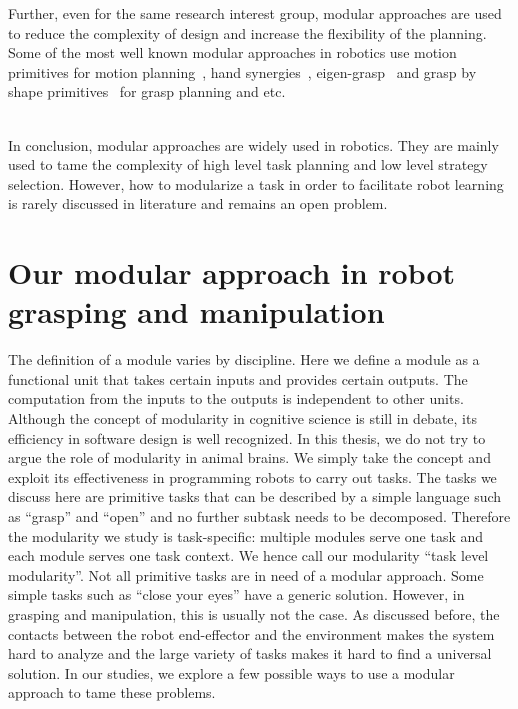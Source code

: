 Further, even for the same research interest group, modular approaches are used to reduce the complexity of design and increase the flexibility of the planning. Some of the most well known modular approaches in robotics use motion primitives for motion planning~\citep{ijspeert2002movement,inamura2004embodied,kulic2008incremental,peters2008reinforcement}, hand synergies~\citep{santello2000force,gabiccini2011role,gioioso2013mapping}, eigen-grasp~\citep{Ciocarlie2009} and grasp by shape primitives~\citep{miller2003automatic,huebner2008minimum} for grasp planning and etc.



~\\
In conclusion, modular approaches are widely used in robotics. They are mainly used to tame the complexity of high level task planning and low level strategy selection. However, how to modularize a task in order to facilitate robot learning is rarely discussed in literature and remains an open problem.






\section{Our modular approach in robot grasping and manipulation}
\label{cha1:contribution}
The definition of a module varies by discipline. Here we define a module as a functional unit that takes certain inputs and provides certain outputs. The computation from the inputs to the outputs is independent to other units. Although the concept of modularity in cognitive science is still in debate, its efficiency in software design is well recognized. In this thesis, we do not try to argue the role of modularity in animal brains. We simply take the concept and exploit its effectiveness in programming robots to carry out tasks. The tasks we discuss here are primitive tasks that can be described by a simple language such as ``grasp'' and ``open'' and no further subtask needs to be decomposed. Therefore the modularity we study is task-specific: multiple modules serve one task and each module serves one task context. We hence call our modularity ``task level modularity''. Not all primitive tasks are in need of a modular approach. Some simple tasks such as ``close your eyes'' have a generic solution. However, in grasping and manipulation, this is usually not the case. As discussed before, the contacts between the robot end-effector and the environment makes the system hard to analyze and the large variety of tasks makes it hard to find a universal solution. In our studies, we explore a few possible ways to use a modular approach to tame these problems.

